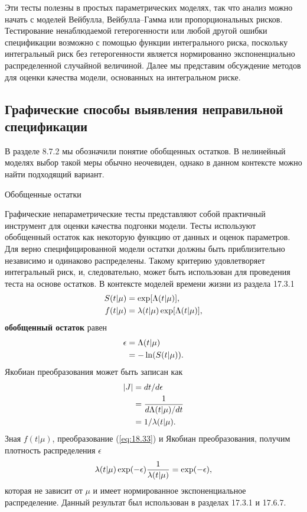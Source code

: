 Эти тесты полезны в простых параметрических моделях, так что анализ можно начать с моделей Вейбулла, Вейбулла--Гамма или пропорциональных рисков. Тестирование ненаблюдаемой гетерогенности или любой другой ошибки спецификации возможно с помощью функции интегрального риска, поскольку интегральный риск без гетерогенности является нормированно экспоненциально распределенной случайной величиной. Далее мы представим обсуждение методов для оценки качества модели, основанных на интегральном риске.




\subsection{Графические способы выявления неправильной спецификации}\label{sec:18.7.2} %

\noindent
В разделе 8.7.2 %
мы обозначили понятие обобщенных остатков. В нелинейный моделях выбор такой меры обычно неочевиден, однако в данном контексте можно найти подходящий вариант.

        \begin{center}{Обобщенные остатки}\end{center}
        \noindent
Графические непараметрические тесты представляют собой практичный инструмент для оценки качества подгонки модели. Тесты используют обобщенный остаток как некоторую функцию от данных и оценок параметров. Для верно специфицированной модели остатки должны быть приблизительно независимо и одинаково распределены. Такому критерию удовлетворяет интегральный риск, и, следовательно, может быть использован для проведения теста на основе остатков. В контексте моделей времени жизни из раздела 17.3.1
    \begin{align}
        S(t|\mu) &= \exp[\Lambda(t|\mu)], \notag \\
        f(t|\mu) &= \lambda(t|\mu)\exp[\Lambda(t|\mu)], \notag
    \end{align}
\textbf{обобщенный остаток} равен
    \begin{align}
        \label{eq:18.33}
        \epsilon &= \Lambda(t|\mu) \\
             &= -\ln (S(t|\mu)). \notag
    \end{align}
Якобиан преобразования может быть записан как
    \begin{align}
        |J| &= dt/d\epsilon \notag \\
            &= \frac{1}{d\Lambda(t|\mu) / dt} \notag \\
            &= 1/\lambda(t|\mu). \notag
    \end{align}
Зная $f(t|\mu)$, преобразование (\ref{eq:18.33}) и Якобиан преобразования, получим плотность распределения $\epsilon$
    \begin{align}
        \label{eq:18.34}
        \lambda(t|\mu) \exp(-\epsilon)\frac{1}{\lambda(t|\mu)} = \exp(-\epsilon),
    \end{align}
которая не зависит от $\mu$ и имеет нормированное экспоненциальное распределение. Данный результат был использован в разделах
17.3.1 и %
17.6.7. %


